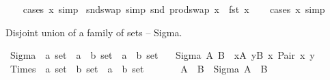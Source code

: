 \begin{isabellebody}
%
\isadelimproof
\ \ %
\endisadelimproof
%
\isatagproof
{}\isamarkupfalse%
\ {\isacharparenleft}{\kern0pt}cases\ x{\isacharparenright}{\kern0pt}\ simp%
\endisatagproof
{\isafoldproof}%
%
\isadelimproof
\isanewline
%
\endisadelimproof
\isanewline
{}\isamarkupfalse%
\ snd{\isacharunderscore}{\kern0pt}swap\ {\isacharbrackleft}{\kern0pt}simp{\isacharbrackright}{\kern0pt}{\isacharcolon}{\kern0pt}\ {\isachardoublequoteopen}snd\ {\isacharparenleft}{\kern0pt}prod{\isachardot}{\kern0pt}swap\ x{\isacharparenright}{\kern0pt}\ {\isacharequal}{\kern0pt}\ fst\ x{\isachardoublequoteclose}\isanewline
%
\isadelimproof
\ \ %
\endisadelimproof
%
\isatagproof
{}\isamarkupfalse%
\ {\isacharparenleft}{\kern0pt}cases\ x{\isacharparenright}{\kern0pt}\ simp%
\endisatagproof
{\isafoldproof}%
%
\isadelimproof
%
\endisadelimproof
%
\begin{isamarkuptext}%
Disjoint union of a family of sets -- Sigma.%
\end{isamarkuptext}\isamarkuptrue%
\isamarkupfalse%
\ Sigma\ {\isacharcolon}{\kern0pt}{\isacharcolon}{\kern0pt}\ {\isachardoublequoteopen}{\isacharprime}{\kern0pt}a\ set\ {\isasymRightarrow}\ {\isacharparenleft}{\kern0pt}{\isacharprime}{\kern0pt}a\ {\isasymRightarrow}\ {\isacharprime}{\kern0pt}b\ set{\isacharparenright}{\kern0pt}\ {\isasymRightarrow}\ {\isacharparenleft}{\kern0pt}{\isacharprime}{\kern0pt}a\ {\isasymtimes}\ {\isacharprime}{\kern0pt}b{\isacharparenright}{\kern0pt}\ set{\isachardoublequoteclose}\isanewline
\ \ \ {\isachardoublequoteopen}Sigma\ A\ B\ {\isasymequiv}\ {\isasymUnion}x{\isasymin}A{\isachardot}{\kern0pt}\ {\isasymUnion}y{\isasymin}B\ x{\isachardot}{\kern0pt}\ {\isacharbraceleft}{\kern0pt}Pair\ x\ y{\isacharbraceright}{\kern0pt}{\isachardoublequoteclose}\isanewline
\isanewline
{}\isamarkupfalse%
\ Times\ {\isacharcolon}{\kern0pt}{\isacharcolon}{\kern0pt}\ {\isachardoublequoteopen}{\isacharprime}{\kern0pt}a\ set\ {\isasymRightarrow}\ {\isacharprime}{\kern0pt}b\ set\ {\isasymRightarrow}\ {\isacharparenleft}{\kern0pt}{\isacharprime}{\kern0pt}a\ {\isasymtimes}\ {\isacharprime}{\kern0pt}b{\isacharparenright}{\kern0pt}\ set{\isachardoublequoteclose}\ \ {\isacharparenleft}{\kern0pt}\ {\isachardoublequoteopen}{\isasymtimes}{\isachardoublequoteclose}\ {}{}{\isacharparenright}{\kern0pt}\isanewline
\ \ \ {\isachardoublequoteopen}A\ {\isasymtimes}\ B\ {\isasymequiv}\ Sigma\ A\ {\isacharparenleft}{\kern0pt}{\isasymlambda}{\isacharunderscore}{\kern0pt}{\isachardot}{\kern0pt}\ B{\isacharparenright}{\kern0pt}{\isachardoublequoteclose}\isanewline

\end{isabellebody}
